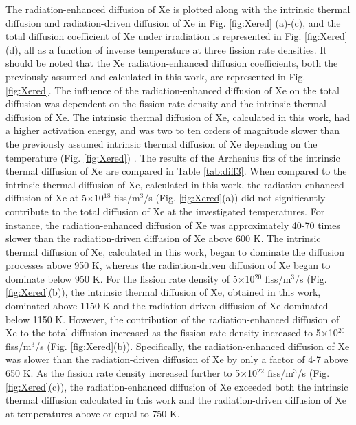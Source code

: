 \documentclass[preprint,12pt]{elsarticle}
\begin{document}
\FloatBarrier


\indent The radiation-enhanced diffusion of Xe is plotted along with the intrinsic thermal diffusion and radiation-driven diffusion of Xe in Fig. \ref{fig:Xered} (a)-(c), and the total diffusion coefficient of Xe under irradiation is represented in Fig. \ref{fig:Xered}(d), all as a function of inverse temperature at three fission rate densities. It should be noted that the Xe radiation-enhanced diffusion coefficients, both the previously assumed \cite{hu2016microstructural, Beeler2018microstructural} and calculated in this work, are represented in Fig. \ref{fig:Xered}. The influence of the radiation-enhanced diffusion of Xe on the total diffusion was dependent on the fission rate density and the intrinsic thermal diffusion of Xe. The intrinsic thermal diffusion of Xe, calculated in this work, had a higher activation energy, and was two to ten orders of magnitude slower than the previously assumed intrinsic thermal diffusion of Xe depending on the temperature (Fig. \ref{fig:Xered}) \cite{hu2016microstructural, Beeler2018microstructural}. The results of the Arrhenius fits of the intrinsic thermal diffusion of Xe are compared in Table \ref{tab:diff3}. When compared to the intrinsic thermal diffusion of Xe, calculated in this work, the radiation-enhanced diffusion of Xe at 5$\times$10$^{18}$ fiss/m$^{3}$/s (Fig. \ref{fig:Xered}(a)) did not significantly contribute to the total diffusion of Xe at the investigated temperatures. For instance, the radiation-enhanced diffusion of Xe was approximately 40-70 times slower than the radiation-driven diffusion of Xe above 600 K. The intrinsic thermal diffusion of Xe, calculated in this work, began to dominate the diffusion processes above 950 K, whereas the radiation-driven diffusion of Xe began to dominate below 950 K. For the fission rate density of 5$\times$10$^{20}$ fiss/m$^{3}$/s (Fig. \ref{fig:Xered}(b)), the intrinsic thermal diffusion of Xe, obtained in this work, dominated above 1150 K and the radiation-driven diffusion of Xe dominated below 1150 K. However, the contribution of the radiation-enhanced diffusion of Xe to the total diffusion increased as the fission rate density increased to 5$\times$10$^{20}$ fiss/m$^{3}$/s (Fig. \ref{fig:Xered}(b)). Specifically, the radiation-enhanced diffusion of Xe was slower than the radiation-driven diffusion of Xe by only a factor of 4-7 above 650 K. As the fission rate density increased further to 5$\times$10$^{22}$ fiss/m$^{3}$/s (Fig. \ref{fig:Xered}(c)), the radiation-enhanced diffusion of Xe exceeded both the intrinsic thermal diffusion calculated in this work and the radiation-driven diffusion of Xe at  temperatures above or equal to 750 K. \\
\end{document}
